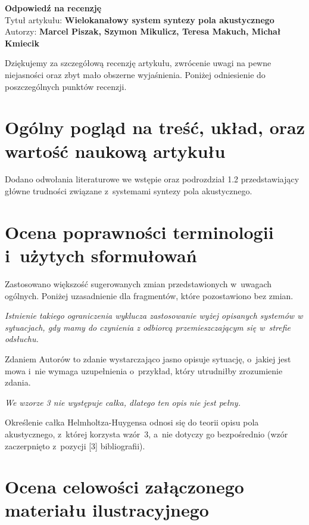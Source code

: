 \documentclass[12pt]{article}
\begin{document}
    \begin{center}
        \textbf{\large Odpowiedź na recenzję }\\
        \vspace{10pt}
        Tytuł artykułu: \textbf{Wielokanałowy system syntezy pola akustycznego} \\
        Autorzy: \textbf{Marcel Piszak, Szymon Mikulicz, Teresa Makuch, Michał Kmiecik}
    \end{center}

    Dziękujemy za szczegółową recenzję artykułu, zwrócenie uwagi na pewne
    niejasności oraz zbyt mało obszerne wyjaśnienia. Poniżej odniesienie do
    poszczególnych punktów recenzji.

    \section{Ogólny pogląd na treść, układ, oraz wartość naukową artykułu}

    Dodano odwołania literaturowe we wstępie oraz podrozdział 1.2 przedstawiający główne trudności związane z~systemami syntezy pola akustycznego.

    \section{Ocena poprawności terminologii i~użytych sformułowań}

    Zastosowano większość sugerowanych zmian przedstawionych w~uwagach ogólnych. Poniżej uzasadnienie dla fragmentów, które pozostawiono bez zmian.

    \textit{Istnienie takiego ograniczenia wyklucza zastosowanie wyżej opisanych systemów w sytuacjach, gdy mamy do czynienia z odbiorcą przemieszczającym się w~strefie odsłuchu.}

    Zdaniem Autorów to zdanie wystarczająco jasno opisuje sytuację, o~jakiej jest mowa i~nie wymaga uzupełnienia o~przykład, który utrudniłby zrozumienie zdania.

    \textit{We wzorze 3 nie występuje całka, dlatego ten opis nie jest pełny.}

    Określenie całka Helmholtza-Huygensa odnosi się do teorii opisu pola akustycznego, z~której korzysta wzór~3, a~nie dotyczy go bezpośrednio (wzór zaczerpnięto z~pozycji [3] bibliografii).

    \section{Ocena celowości załączonego materiału ilustracyjnego}
\end{document}

